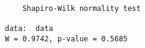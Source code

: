 \begin{verbatim} 

	Shapiro-Wilk normality test

data:  data
W = 0.9742, p-value = 0.5685

\end{verbatim}